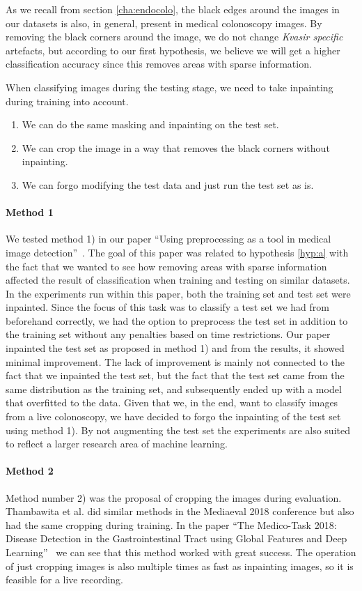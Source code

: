 As we recall from section \ref{cha:endocolo}, the black edges around the images in our datasets is also, in general, present in medical colonoscopy images. By removing the black corners around the image, we do not change \textit{Kvasir specific} artefacts, but according to our first hypothesis, we believe we will get a higher classification accuracy since this removes areas with sparse information.

When classifying images during the testing stage, we need to take inpainting during training into account. 
\begin{enumerate}
\item We can do the same masking and inpainting on the test set. 
\item We can crop the image in a way that removes the black corners without inpainting.
\item We can forgo modifying the test data and just run the test set as is. 
\end{enumerate}


\paragraph{Method 1}
We tested method 1) in our paper ``Using preprocessing as a tool in medical image detection''~\cite{26254}.
The goal of this paper was related to hypothesis \ref{hyp:a} with the fact that we wanted to see how removing areas with sparse information affected the result of classification when training and testing on similar datasets. 
In the experiments run within this paper, both the training set and test set were inpainted. 
Since the focus of this task was to classify a test set we had from beforehand correctly, we had the option to preprocess the test set in addition to the training set without any penalties based on time restrictions. 
Our paper inpainted the test set as proposed in method 1) and from the results, it showed minimal improvement. The lack of improvement is mainly not connected to the fact that we inpainted the test set, but the fact that the test set came from the same distribution as the training set, and subsequently ended up with a model that overfitted to the data.
Given that we, in the end, want to classify images from a live colonoscopy, we have decided to forgo the inpainting of the test set using method 1).
By not augmenting the test set the experiments are also suited to reflect a larger research area of machine learning.



\paragraph{Method 2}
Method number 2) was the proposal of cropping the images during evaluation.  Thambawita et al. did similar methods in the Mediaeval 2018 conference but also had the same cropping during training. In the paper ``The Medico-Task 2018: Disease Detection in the Gastrointestinal Tract using Global Features and Deep Learning''~\cite{26205} we can see that this method worked with great success. 
The operation of just cropping images is also multiple times as fast as inpainting images, so it is feasible for a live recording. 

